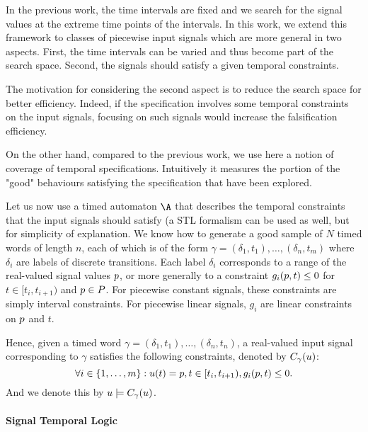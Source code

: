 In the previous work, the time intervals are fixed and we search for the signal values at the extreme time points of the intervals. In this work, we extend this framework to classes of piecewise input signals which are more general in two aspects. First, the time intervals can be varied and thus become part of the search space. Second, the signals should satisfy a given temporal constraints. 


The motivation for considering the second aspect is to reduce the search space for better efficiency. Indeed, if the specification involves some temporal constraints on the input signals, focusing on such signals would increase the falsification efficiency. 

On the other hand, compared to the previous work, we use here a notion of coverage of temporal specifications. Intuitively it measures the portion of the "good" behaviours satisfying the specification that have been explored.


Let us now use a timed automaton $\A$ that describes the temporal constraints that the input signals should satisfy (a STL formalism can be used as well, but for simplicity of explanation. We know how to generate a good sample of $N$ timed words of length $n$, each of which is of the form $\gamma = (\delta_1, t_1), \ldots, (\delta_n, t_m)$ where $\delta_i$ are labels of discrete transitions. Each label $\delta_i$ corresponds to a range of the real-valued signal values $p$, or more generally to a constraint $g_i(p, t) \le 0$ for $t \in [t_i, t_{i+1})$ and $p \in P$. For piecewise constant signals, these constraints are simply interval constraints. For piecewise linear signals, $g_i$ are linear constraints on $p$ and $t$. 

Hence, given a timed word $\gamma = (\delta_1, t_1), \ldots, (\delta_n, t_n)$, a real-valued input signal corresponding to $\gamma$ satisfies the following constraints, denoted by $C_{\gamma}(u)$:
$$\forall i \in \{1, \ldots, m \}: u (t)= p, t \in [t_i, t_{i+1}), g_i(p,t)  \le 0.$$
And we denote this by $u \models C_{\gamma}(u)$.

\paragraph{Signal Temporal Logic} 

